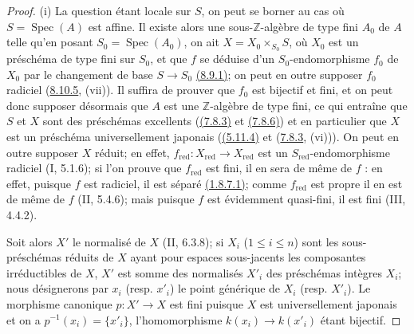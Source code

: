 \begin{proof}
\textup{(i)} La question étant locale sur $S$, on peut se borner au cas
où $S=\operatorname{Spec}(A)$ est affine. Il existe alors une
sous-$\mathbb Z$-algèbre de type fini $A_0$ de $A$ telle qu'en posant
$S_0=\operatorname{Spec}(A_0)$, on ait
$X=X_0\times_{S_0}S$, où $X_0$ est un préschéma de type fini sur $S_0$,
et que $f$ se déduise d'un $S_0$-endomorphisme $f_0$ de $X_0$ par le
changement de base $S\to S_0$
{\hyperlink{ega4.c04.prop.8-9-1}{(8.9.1)}}; on peut en outre supposer
$f_0$ radiciel ({\hyperlink{ega4.c04.thm.8-10-5}{8.10.5}}, (vii)). Il
suffira de prouver que $f_0$ est bijectif et fini, et on peut donc
supposer désormais que $A$ est une $\mathbb Z$-algèbre de type fini, ce
qui entraîne que $S$ et $X$ sont des préschémas excellents
({\hyperlink{ega4.c04.statement.7-8-3}{(7.8.3)}} et
{\hyperlink{ega4.c04.prop.7-8-6}{(7.8.6)}}) et en particulier que $X$
est un préschéma universellement japonais
({\hyperlink{ega4.c04.cor.5-11-4}{(5.11.4)}} et
({\hyperlink{ega4.c04.statement.7-8-3}{7.8.3}}, (vi))). On peut en outre
supposer $X$ réduit; en effet,
$f_{\mathrm{red}}:X_{\mathrm{red}}\to X_{\mathrm{red}}$ est un
$S_{\mathrm{red}}$-endomorphisme radiciel (I, 5.1.6); si l'on prouve que
$f_{\mathrm{red}}$ est fini, il en sera de même de $f$ : en effet,
puisque $f$ est radiciel, il est séparé
{\hyperlink{ega4.c04.lem.1-8-7-1}{(1.8.7.1)}}; comme
$f_{\mathrm{red}}$ est propre il en est de même de $f$ (II, 5.4.6);
mais puisque $f$ est évidemment quasi-fini, il est fini (III, 4.4.2).

Soit alors $X'$ le normalisé de $X$ (II, 6.3.8); si $X_i$
($1\leq i\leq n$) sont les sous-préschémas réduits de $X$ ayant pour
espaces sous-jacents les composantes irréductibles de $X$, $X'$ est
somme des normalisés $X'_i$ des préschémas intègres $X_i$; nous
désignerons par $x_i$ (resp. $x'_i$) le point générique de $X_i$
(resp. $X'_i$). Le morphisme canonique $p:X'\to X$ est fini puisque
$X$ est universellement japonais et on a
$p^{-1}(x_i)=\{x'_i\}$, l'homomorphisme $k(x_i)\to k(x'_i)$ étant
bijectif.


\end{proof}
